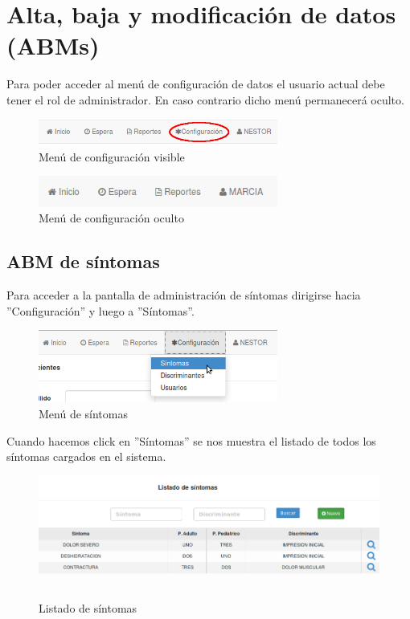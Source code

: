 \section{Alta, baja y modificación de datos (ABMs)}
Para poder acceder al menú de configuración de datos el usuario actual debe tener el rol de administrador. En caso contrario dicho menú permanecerá oculto.

\begin{figure}[h]
\centerline{\includegraphics[width=0.7\textwidth]{menu_configuracion_visible.png}}
\caption{Menú de configuración visible}
\end{figure}

\begin{figure}[h]
\centerline{\includegraphics[width=0.7\textwidth]{menu_configuracion_oculto.png}}
\caption{Menú de configuración oculto}
\end{figure}

\subsection{ABM de síntomas}
Para acceder a la pantalla de administración de síntomas dirigirse hacia ''Configuración'' y luego a ''Síntomas''.

\begin{figure}[h]
\centerline{\includegraphics[width=0.7\textwidth]{menu_sintomas.png}}
\caption{Menú de síntomas}
\end{figure}

Cuando hacemos click en ''Síntomas'' se nos muestra el listado de todos los síntomas cargados en el sistema.

\begin{figure}[h]
\centerline{\includegraphics[width=1\textwidth]{sintomas_listado.png}}
\caption{Listado de síntomas}
\end{figure}

